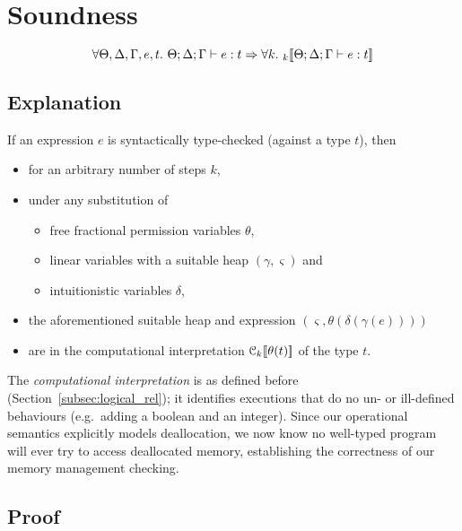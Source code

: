 \section{Soundness}
\[
    \forall \Theta, \Delta, \Gamma, e, t.\ \Theta; \Delta ; \Gamma \vdash e : t \Rightarrow
    \forall k.\ \den{}{k}{ \Theta; \Delta ; \Gamma \vdash e : t }
\]

\subsection{Explanation}

If an expression $e$ is syntactically type-checked (against a type $t$), then
\begin{itemize}
    \item for an arbitrary number of steps $k$,
    \item under any substitution of
        \begin{itemize}
            \item free fractional permission variables $\theta$,
            \item linear variables with a suitable heap $(\gamma, \varsigma)$ and
            \item intuitionistic variables $\delta$,
        \end{itemize}
    \item the aforementioned suitable heap and expression $(\varsigma, \theta(\delta(\gamma(e))))$
    \item are in the computational interpretation $\mathcal{C}_{k} [\![  \theta(t)  ]\!]$ of the type $t$.
\end{itemize}
The \emph{computational interpretation} is as defined before
(Section~\ref{subsec:logical_rel}); it identifies executions that do no un- or
ill-defined behaviours (e.g.\ adding a boolean and an integer). Since our
operational semantics explicitly models deallocation, we now know no well-typed
program will ever try to access deallocated memory, establishing the
correctness of our memory management checking.

\subsection{Proof}

